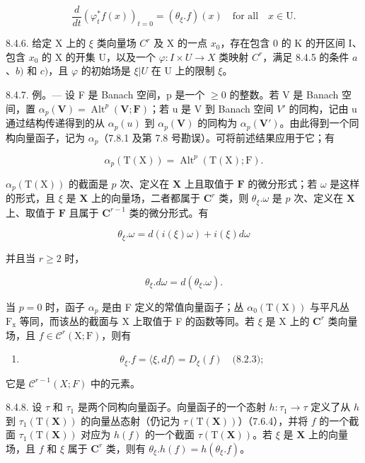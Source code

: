 \[
\frac {d}{d t} \left(\varphi_ {t} ^ {*} f (x)\right) _ {t = 0} = \left(\theta_ {\xi}. f\right) (x) \quad \text {for all} \quad x \in \mathrm{U}.\tag{2}
\]

8.4.6. 给定 X 上的 \(\xi\) 类向量场 \(C^r\) 及 X 的一点 \(x_0\)，存在包含 0 的 K 的开区间 I、包含 \(x_0\) 的 X 的开集 U，以及一个 \(\varphi: I \times U \to X\) 类映射 \(C^r\)，满足 8.4.5 的条件 \(a\)、\(b)\) 和 \(c)\)，且 \(\varphi\) 的初始场是 \(\xi|U\) 在 U 上的限制 \(\xi\)。

8.4.7. 例。--- 设 F 是 Banach 空间，p 是一个 \(\geqslant0\) 的整数。若 V 是 Banach 空间，置 \(\alpha_{p}(\mathbf{V}) = \operatorname{Alt}^{p}(\mathbf{V}; \mathbf{F})\)；若 u 是 V 到 Banach 空间 \(V'\) 的同构，记由 u 通过结构传递得到的从 \(\alpha_{p}(u)\) 到 \(\alpha_{p}(\mathbf{V})\) 的同构为 \(\alpha_{p}(\mathbf{V}')\)。由此得到一个同构向量函子，记为 \(\alpha_{p}\)（7.8.1 及第 7.8 号勘误）。可将前述结果应用于它；有

\[
\alpha_ {p} (\mathrm{T} (\mathrm{X})) = \operatorname{Alt}^{p}(\mathrm{T} (\mathrm{X}); \mathrm{F}).
\]

\(\alpha_{p}(\mathrm{T}(\mathrm{X}))\) 的截面是 \(p\) 次、定义在 \(\mathbf{X}\) 上且取值于 \(\mathbf{F}\) 的微分形式；若 \(\omega\) 是这样的形式，且 \(\xi\) 是 \(\mathbf{X}\) 上的向量场，二者都属于 \(\mathbf{C}^{r}\) 类，则 \(\theta_{\xi}.\omega\) 是 \(p\) 次、定义在 \(\mathbf{X}\) 上、取值于 \(\mathbf{F}\) 且属于 \(\mathbf{C}^{r-1}\) 类的微分形式。有

\[
\theta_ {\xi}. \omega = d (i (\xi) \omega) + i (\xi) d \omega\tag{3}
\]

并且当 \(r \geqslant 2\) 时，

\[
\theta_ {\xi}. d \omega = d (\theta_ {\xi}. \omega).\tag{4}
\]

当 \(p=0\) 时，函子 \(\alpha_{p}\) 是由 F 定义的常值向量函子；丛 \(\alpha_{0}(\mathrm{T}(\mathrm{X}))\) 与平凡丛 \(\mathrm{F}_{\mathrm{x}}\) 等同，而该丛的截面与 X 上取值于 F 的函数等同。若 \(\xi\) 是 X 上的 \(\mathbf{C}^{r}\) 类向量场，且 \(f\in\mathcal{C}^{r}(\mathrm{X};\mathrm{F})\)，则有

\begin{enumerate}
\def\labelenumi{(\arabic{enumi})}
\setcounter{enumi}{4}
\tightlist
\item
  \[
  \theta_ {\xi}. f = \langle \xi , d f \rangle = D _ {\xi} (f) \quad \text{(8.2.3)};
  \]
\end{enumerate}

它是 \(\mathcal{C}^{r-1}(X;F)\) 中的元素。

8.4.8. 设 \(\tau\) 和 \(\tau_{1}\) 是两个同构向量函子。向量函子的一个态射 \(h\colon \tau_{1}\to \tau\) 定义了从 \(h\) 到 \(\tau_{1}(\mathrm{T}(\mathbf{X}))\) 的向量丛态射（仍记为 \(\tau (\mathrm{T}(\mathbf{X}))\)）（7.6.4），并将 \(f\) 的一个截面 \(\tau_{1}(\mathrm{T}(\mathbf{X}))\) 对应为 \(h(f)\) 的一个截面 \(\tau (\mathrm{T}(\mathbf{X}))\)。若 \(\xi\) 是 \(\mathbf{X}\) 上的向量场，且 \(f\) 和 \(\xi\) 属于 \(\mathbf{C}^r\) 类，则有 \(\theta_{\xi}.h(f) = h(\theta_{\xi}.f)\)。

